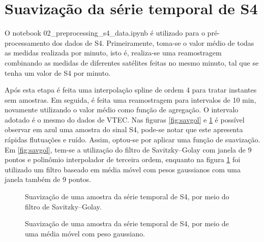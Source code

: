 \section{Suavização da série temporal de S4}

O notebook 02\_preprocessing\_s4\_data.ipynb é utilizado para o pré-processamento dos dados de S4. Primeiramente, toma-se o valor médio de todas as medidas realizada por minuto, isto é, realiza-se uma reamostragem combinando as medidas de diferentes satélites feitas no mesmo minuto, tal que se tenha um valor de S4 por minuto. 

Após esta etapa é feita uma interpolação spline de ordem 4 para tratar instantes sem amostras. Em seguida, é feita uma reamostragem para intervalos de 10 min, novamente utilizando o valor médio como função de agregação. O intervalo adotado é o mesmo do dados de VTEC. Nas figuras \ref{fig:savgol} e \ref{fig:gaussian} é possível observar em azul uma amostra do sinal S4, pode-se notar que este apresenta rápidas flutuações e ruído. Assim, optou-se por aplicar uma função de suavização. Em \ref{fig:savgol}, tem-se a utilização do filtro de Savitzky–Golay com janela de 9 pontos e polinômio interpolador de terceira ordem, enquanto na figura \ref{fig:gaussian} foi utilizado um filtro baseado em média móvel com pesos gaussianos com uma janela também de 9 pontos.

\begin{figure}[H]
\centering
{}
\caption{Suavização de uma amostra da série temporal de S4, por meio do filtro de Savitzky–Golay.}
\label{fig:savgol}


\caption{Suavização de uma amostra da série temporal de S4, por meio de uma média móvel com peso gaussiano.}
\label{fig:gaussian}
\end{figure}

